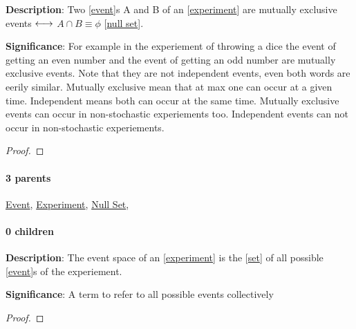 \documentclass[../main.tex]{subfiles}
\begin{document}
\begin{statement}
\label{statement:Mutually Exclusive Events}\hspace*{0pt}\par
\end{statement}
\textbf{Description}:
Two [\hyperref[statement:Event]{event}]s A and B of an [\hyperref[statement:Experiment]{experiment}] are mutually exclusive events $ \longleftrightarrow $ $ A \cap B \equiv \phi $ [\hyperref[statement:Null Set]{null set}].
\par
{\color{magenta} \textbf{Significance}:
For example in the experiement of throwing a dice the event of getting an even number and the event of getting an odd number are mutually exclusive events.
Note that they are not independent events, even both words are eerily similar.
Mutually exclusive mean that at max one can occur at a given time.
Independent means both can occur at the same time.
Mutually exclusive events can occur in non-stochastic experiements too.
Independent events can not occur in non-stochastic experiements.
\par}
\begin{proof}
\proofbydefinition
\end{proof}\par
\paragraph{3 parents} \hyperref[statement:Event]{Event}, \hyperref[statement:Experiment]{Experiment}, \hyperref[statement:Null Set]{Null Set}, 
\paragraph{0 children} 



\begin{statement}
\label{statement:Event Space}\hspace*{0pt}\par
\end{statement}
\textbf{Description}:
The event space of an [\hyperref[statement:Experiment]{experiment}] is the [\hyperref[statement:Set]{set}] of all possible [\hyperref[statement:Event]{event}]s of the experiement.
\par
{\color{magenta} \textbf{Significance}:
A term to refer to all possible events collectively
\par}
\begin{proof}
\proofbydefinition
\end{proof}\par
\end{document}
